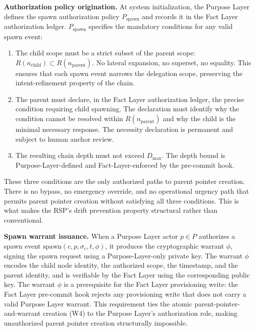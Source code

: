 \bigskip
\noindent\textbf{Authorization policy origination.} At system initialization, the Purpose Layer defines the spawn authorization policy $P_{\mathrm{spawn}}$ and records it in the Fact Layer authorization ledger. $P_{\mathrm{spawn}}$ specifies the mandatory conditions for any valid spawn event:

\begin{enumerate}
    \item[(S1) \textbf{Scope refinement}] The child scope must be a strict subset of the parent scope: $R(n_{\mathrm{child}}) \subset R(n_{\mathrm{parent}})$. No lateral expansion, no superset, no equality. This ensures that each spawn event narrows the delegation scope, preserving the intent-refinement property of the chain.

    \item[(S2) \textbf{Operational necessity}] The parent must declare, in the Fact Layer authorization ledger, the precise condition requiring child spawning. The declaration must identify why the condition cannot be resolved within $R(n_{\mathrm{parent}})$ and why the child is the minimal necessary response. The necessity declaration is permanent and subject to human anchor review.

    \item[(S3) \textbf{Depth within bound}] The resulting chain depth must not exceed $D_{\max}$. The depth bound is Purpose-Layer-defined and Fact-Layer-enforced by the pre-commit hook.
\end{enumerate}

These three conditions are the only authorized paths to parent pointer creation. There is no bypass, no emergency override, and no operational urgency path that permits parent pointer creation without satisfying all three conditions. This is what makes the RSP's drift prevention property structural rather than conventional.

\bigskip
\noindent\textbf{Spawn warrant issuance.} When a Purpose Layer actor $p \in P$ authorizes a spawn event $\mathrm{spawn}(c, p, \sigma_c, t, \phi)$, it produces the cryptographic warrant $\phi$, signing the spawn request using a Purpose-Layer-only private key. The warrant $\phi$ encodes the child node identity, the authorized scope, the timestamp, and the parent identity, and is verifiable by the Fact Layer using the corresponding public key. The warrant $\phi$ is a prerequisite for the Fact Layer provisioning write: the Fact Layer pre-commit hook rejects any provisioning write that does not carry a valid Purpose Layer warrant. This requirement ties the atomic parent-pointer-and-warrant creation (W4) to the Purpose Layer's authorization role, making unauthorized parent pointer creation structurally impossible.

